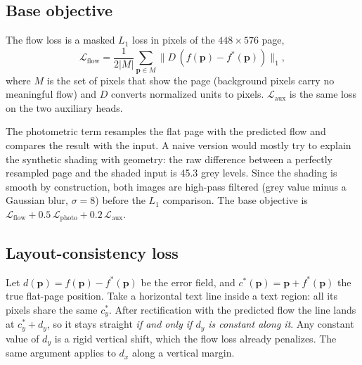 \documentclass[conference]{IEEEtran}
\newcommand{\Lflow}{\mathcal{L}_{\mathrm{flow}}}
\newcommand{\Lphoto}{\mathcal{L}_{\mathrm{photo}}}
\newcommand{\Laux}{\mathcal{L}_{\mathrm{aux}}}
\begin{document}
\subsection{Base objective}
The flow loss is a masked $L_1$ loss in pixels of the $448\times576$ page,
\begin{equation}
\Lflow = \frac{1}{2|M|}\sum_{\mathbf{p}\in M} \big\| D\,(f(\mathbf{p}) - f^*(\mathbf{p})) \big\|_1 ,
\end{equation}
where $M$ is the set of pixels that show the page (background pixels carry no meaningful flow) and $D$ converts normalized units to pixels. $\Laux$ is the same loss on the two auxiliary heads.

The photometric term resamples the flat page with the predicted flow and compares the result with the input. A naive version would mostly try to explain the synthetic shading with geometry: the raw difference between a perfectly resampled page and the shaded input is 45.3 grey levels. Since the shading is smooth by construction, both images are high-pass filtered (grey value minus a Gaussian blur, $\sigma=8$) before the $L_1$ comparison. The base objective is $\Lflow + 0.5\,\Lphoto + 0.2\,\Laux$.

\subsection{Layout-consistency loss}
\label{sec:lay}
Let $d(\mathbf{p}) = f(\mathbf{p}) - f^*(\mathbf{p})$ be the error field, and $c^*(\mathbf{p}) = \mathbf{p}+f^*(\mathbf{p})$ the true flat-page position. Take a horizontal text line inside a text region: all its pixels share the same $c^*_y$. After rectification with the predicted flow the line lands at $c^*_y + d_y$, so it stays straight \emph{if and only if $d_y$ is constant along it}. Any constant value of $d_y$ is a rigid vertical shift, which the flow loss already penalizes. The same argument applies to $d_x$ along a vertical margin.
\end{document}
